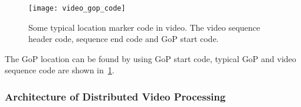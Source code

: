 \begin{figure}[!htbp]
  \centering
  \begin{minipage}{1.0\columnwidth}
  \texttt{[image: video\_gop\_code]}
  \end{minipage}
  
  \vspace{-1ex}
  \caption
    {
    \small
    Some typical location marker code in video. The video sequence header code,
    sequence end code and GoP start code. 
    }
  \label{fig:video_gop_code}
\end{figure}

The GoP location can be found by using GoP start code, typical GoP and video
sequence code are shown in~\fig\ref{fig:video_gop_code}. 


\subsubsection{Architecture of Distributed Video Processing}




